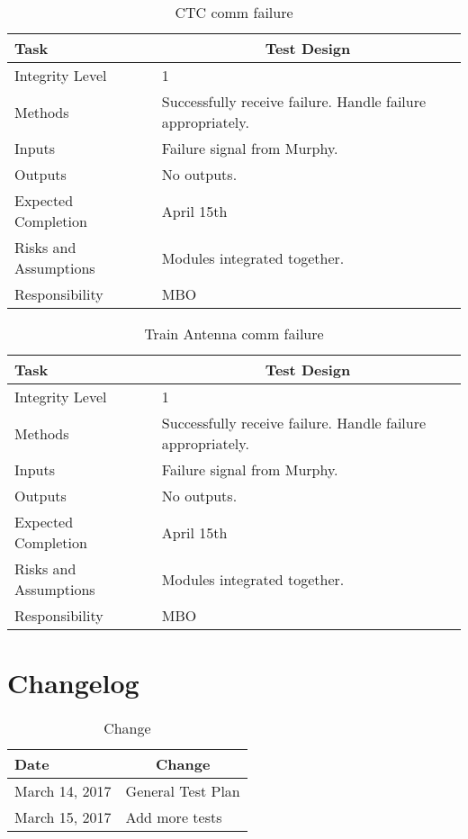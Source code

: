 \documentclass[]{article}
\begin{document}
\begin{table}[H]
	\centering
	\caption{CTC comm failure}
	\begin{tabular}{|l|l|}
		\hline
		Task & \multicolumn{1}{c|}{Test Design} \\ \hline
		Integrity Level & 1 \\ \hline
		Methods & \parbox[t]{10cm}{Successfully receive failure. Handle failure appropriately. }\\ \hline
		Inputs &  \parbox[t]{10cm}{Failure signal from Murphy. } \\ \hline
		Outputs &  \parbox[t]{10cm}{No outputs. } \\ \hline
		Expected Completion & April 15th \\ \hline
		Risks and Assumptions & \parbox[t]{10cm}{Modules integrated together.}  \\ \hline
		Responsibility & MBO\\ \hline
	\end{tabular}
\end{table}

\begin{table}[H]
	\centering
	\caption{Train Antenna comm failure}
	\begin{tabular}{|l|l|}
		\hline
		Task & \multicolumn{1}{c|}{Test Design} \\ \hline
		Integrity Level & 1 \\ \hline
		Methods & \parbox[t]{10cm}{Successfully receive failure. Handle failure appropriately. }\\ \hline
		Inputs &  \parbox[t]{10cm}{Failure signal from Murphy. } \\ \hline
		Outputs &  \parbox[t]{10cm}{No outputs. } \\ \hline
		Expected Completion & April 15th \\ \hline
		Risks and Assumptions & \parbox[t]{10cm}{Modules integrated together.}  \\ \hline
		Responsibility & MBO\\ \hline
	\end{tabular}
\end{table}


\section{Changelog}

\begin{table}[H]
	\centering
	\caption{Change}
	\label{changelogl}
	\begin{tabular}{|l|l|}
		\hline
		Date & \multicolumn{1}{c|}{Change} \\ \hline
		March 14, 2017 & General Test Plan \\ \hline
		March 15, 2017 & Add more tests \\ \hline
	\end{tabular}
\end{table}
\end{document}
